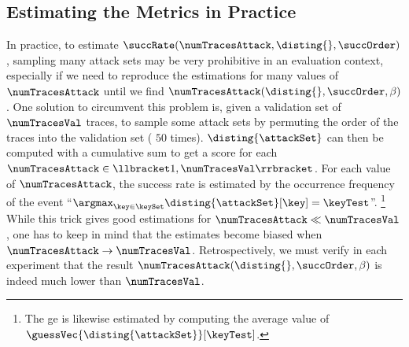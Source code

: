 \subsection{Estimating the Metrics in Practice}
\label{sec:estimate_practice}
In practice, to estimate \(\succRate(\numTracesAttack, \disting{}, \succOrder)\), sampling many attack sets may be very prohibitive in an evaluation context, especially if we need to reproduce the estimations for many values of \(\numTracesAttack\) until we find \(\numTracesAttack(\disting{}, \succOrder, \beta)\).
One solution to circumvent this problem is, given a validation set of \(\numTracesVal\) traces, to sample some attack sets by permuting the order of the traces into the validation set (\eg{} \(50\) times).
\(\disting{\attackSet}\) can then be computed with a cumulative sum to get a score for each \(\numTracesAttack \in \llbracket 1, \numTracesVal \rrbracket\).
For each value of \(\numTracesAttack\), the success rate is estimated by the occurrence frequency of the event ``\(\argmax_{\key \in \keySet} \disting{\attackSet}[\key] = \keyTest\)''.%
\footnote{
    The \gls{ge} is likewise estimated by computing the average value of \(\guessVec{\disting{\attackSet}}[\keyTest]\).
}
While this trick gives good estimations for \(\numTracesAttack \ll \numTracesVal\), one has to keep in mind that the estimates become biased when \(\numTracesAttack \to \numTracesVal\).
Retrospectively, we must verify in each experiment that the result  \(\numTracesAttack(\disting{}, \succOrder, \beta)\) is indeed much lower than \(\numTracesVal\).